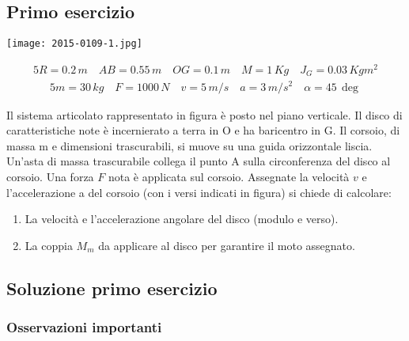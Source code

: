 \documentclass[main.tex]{subfiles}
\begin{document}
\subsection{Primo esercizio}

 \texttt{[image: 2015-0109-1.jpg]}

\begin{alignat*}{5}
	R = 0.2\,m \quad
	AB = 0.55\,m \quad
	OG = 0.1\,m \quad
	M = 1\,Kg\quad
	J_G = 0.03\,Kgm^2
\end{alignat*}
\begin{alignat*}{5}
	m = 30\,kg\quad
	F = 1000\,N\quad
	v = 5\,m/s\quad
	a= 3\,m/s^2\quad
	\alpha = 45\,\deg
\end{alignat*}

Il sistema articolato rappresentato in figura è posto nel piano verticale. Il disco di caratteristiche note è incernierato a terra in O e ha baricentro in G. Il corsoio, di massa m e dimensioni trascurabili, si muove su una guida orizzontale liscia. Un’asta di massa trascurabile collega il punto A sulla circonferenza del disco al corsoio. Una forza $F$ nota è applicata sul corsoio. Assegnate la velocità $v$ e l’accelerazione a del corsoio (con i versi indicati in figura) si chiede di calcolare:

\begin{enumerate}
	\item La velocità e l’accelerazione angolare del disco (modulo e verso).
	\item La coppia $M_m$ da applicare al disco per garantire il moto assegnato.
\end{enumerate}

\clearpage

\subsection{Soluzione primo esercizio}

\subsubsection{Osservazioni importanti}
\end{document}
